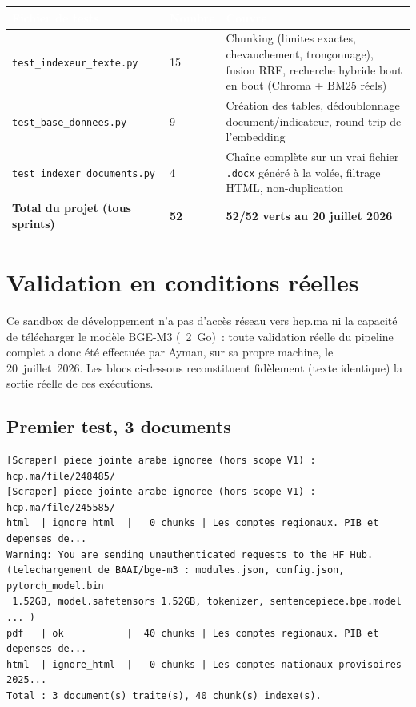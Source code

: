 \documentclass[11pt,a4paper]{article}
\newcommand{\tblhead}[1]{\textcolor{white}{\textbf{#1}}}
\begin{document}
\begin{longtable}{@{}p{6.5cm}p{2cm}p{6.5cm}@{}}
\rowcolor{navy}
\tblhead{Fichier de tests} & \tblhead{Nombre} & \tblhead{Couvre} \\
\midrule
\endhead
\texttt{test\_indexeur\_texte.py} & 15 & Chunking (limites exactes, chevauchement, tronçonnage), fusion RRF, recherche hybride bout en bout (Chroma + BM25 r\'eels) \\
\texttt{test\_base\_donnees.py} & 9 & Cr\'eation des tables, d\'edoublonnage document/indicateur, round-trip de l'embedding \\
\texttt{test\_indexer\_documents.py} & 4 & Cha\^ine compl\`ete sur un vrai fichier \texttt{.docx} g\'en\'er\'e \`a la vol\'ee, filtrage HTML, non-duplication \\
\rowcolor{lightgrey} \textbf{Total du projet (tous sprints)} & \textbf{52} & \textbf{52/52 verts au 20 juillet 2026} \\
\end{longtable}

\section{Validation en conditions r\'eelles}
Ce sandbox de d\'eveloppement n'a pas d'acc\`es r\'eseau vers hcp.ma ni la capacit\'e de t\'el\'echarger le mod\`ele BGE-M3 (~2~Go)~: toute validation r\'eelle du pipeline complet a donc \'et\'e effectu\'ee par Ayman, sur sa propre machine, le 20~juillet~2026. Les blocs ci-dessous reconstituent fid\`element (texte identique) la sortie r\'eelle de ces ex\'ecutions.

\subsection{Premier test, 3 documents}
\begin{terminal}[title={PS> python -m scripts.indexer\_documents --limite 3}]
\begin{Verbatim}
[Scraper] piece jointe arabe ignoree (hors scope V1) : hcp.ma/file/248485/
[Scraper] piece jointe arabe ignoree (hors scope V1) : hcp.ma/file/245585/
html  | ignore_html  |   0 chunks | Les comptes regionaux. PIB et depenses de...
Warning: You are sending unauthenticated requests to the HF Hub.
(telechargement de BAAI/bge-m3 : modules.json, config.json, pytorch_model.bin
 1.52GB, model.safetensors 1.52GB, tokenizer, sentencepiece.bpe.model ... )
pdf   | ok           |  40 chunks | Les comptes regionaux. PIB et depenses de...
html  | ignore_html  |   0 chunks | Les comptes nationaux provisoires 2025...
Total : 3 document(s) traite(s), 40 chunk(s) indexe(s).
\end{Verbatim}
\end{terminal}
\end{document}
